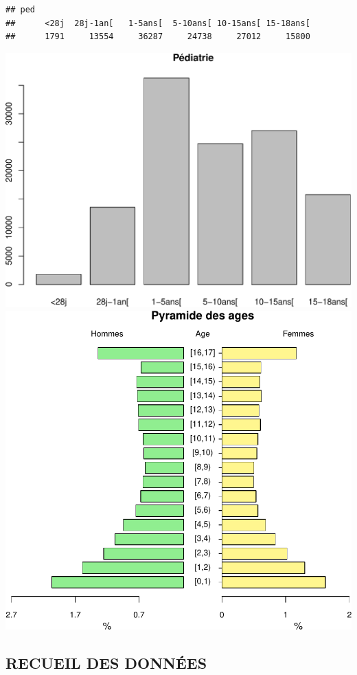 \documentclass[]{article}
\begin{document}
\begin{verbatim}
## ped
##      <28j  28j-1an[   1-5ans[  5-10ans[ 10-15ans[ 15-18ans[ 
##      1791     13554     36287     24738     27012     15800
\end{verbatim}

\includegraphics{rapport2014_V4_files/figure-latex/pop18-1.pdf}
\includegraphics{rapport2014_V4_files/figure-latex/pop18-2.pdf}

\subsection{RECUEIL DES DONNÉES}\label{recueil-des-donnees-1}
\end{document}
